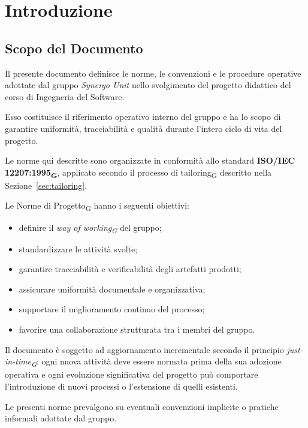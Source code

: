 
\section{Introduzione}

\subsection{Scopo del Documento}

Il presente documento definisce le norme, le convenzioni e le procedure operative adottate dal gruppo \textit{Synergo Unit} nello svolgimento del progetto didattico del corso di Ingegneria del Software.

Esso costituisce il riferimento operativo interno del gruppo e ha lo scopo di garantire uniformità, tracciabilità e qualità durante l'intero ciclo di vita del progetto.

Le norme qui descritte sono organizzate in conformità allo standard \textbf{ISO/IEC 12207:1995\textsubscript{G}}, applicato secondo il processo di tailoring\textsubscript{G} descritto nella Sezione~\ref{sec:tailoring}.

Le Norme di Progetto\textsubscript{G} hanno i seguenti obiettivi:
\begin{itemize}
    \item definire il \textit{way of working\textsubscript{G}} del gruppo;
    \item standardizzare le attività svolte;
    \item garantire tracciabilità e verificabilità degli artefatti prodotti;
    \item assicurare uniformità documentale e organizzativa;
    \item supportare il miglioramento continuo del processo;
    \item favorire una collaborazione strutturata tra i membri del gruppo.
\end{itemize}

Il documento è soggetto ad aggiornamento incrementale secondo il principio \textit{just-in-time\textsubscript{G}}: ogni nuova attività deve essere normata prima della sua adozione operativa e ogni evoluzione significativa del progetto può comportare l'introduzione di nuovi processi o l'estensione di quelli esistenti.

Le presenti norme prevalgono su eventuali convenzioni implicite o pratiche informali adottate dal gruppo.

